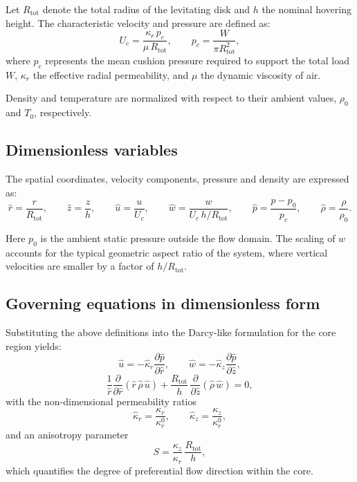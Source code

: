 \documentclass[11pt,a4paper]{article}
\begin{document}
Let \(R_{\mathrm{tot}}\) denote the total radius of the levitating disk and \(h\) the nominal hovering height.  
The characteristic velocity and pressure are defined as:
\[
U_c = \frac{\kappa_r\,p_c}{\mu\,R_{\mathrm{tot}}}, 
\qquad 
p_c = \frac{W}{\pi R_{\mathrm{tot}}^2},
\]
where \(p_c\) represents the mean cushion pressure required to support the total load \(W\), \(\kappa_r\) the effective radial permeability, and \(\mu\) the dynamic viscosity of air.

Density and temperature are normalized with respect to their ambient values, \(\rho_0\) and \(T_0\), respectively.

\subsection{Dimensionless variables}

The spatial coordinates, velocity components, pressure and density are expressed as:
\[
\hat{r} = \frac{r}{R_{\mathrm{tot}}}, \qquad
\hat{z} = \frac{z}{h}, \qquad
\hat{u} = \frac{u}{U_c}, \qquad
\hat{w} = \frac{w}{U_c \, h / R_{\mathrm{tot}}}, \qquad
\hat{p} = \frac{p - p_0}{p_c}, \qquad
\hat{\rho} = \frac{\rho}{\rho_0}.
\]

Here \(p_0\) is the ambient static pressure outside the flow domain.  
The scaling of \(w\) accounts for the typical geometric aspect ratio of the system, where vertical velocities are smaller by a factor of \(h/R_{\mathrm{tot}}\).

\subsection{Governing equations in dimensionless form}

Substituting the above definitions into the Darcy-like formulation for the core region yields:
\[
\hat{u} = -\hat{\kappa}_r \frac{\partial \hat{p}}{\partial \hat{r}}, 
\qquad
\hat{w} = -\hat{\kappa}_z \frac{\partial \hat{p}}{\partial \hat{z}},
\]
\[
\frac{1}{\hat{r}} \frac{\partial}{\partial \hat{r}} 
\left( \hat{r}\, \hat{\rho} \, \hat{u} \right)
+ \frac{R_{\mathrm{tot}}}{h} \,
\frac{\partial}{\partial \hat{z}} 
\left( \hat{\rho} \, \hat{w} \right)
= 0,
\]
with the non-dimensional permeability ratios
\[
\hat{\kappa}_r = \frac{\kappa_r}{\kappa_r^0}, 
\qquad 
\hat{\kappa}_z = \frac{\kappa_z}{\kappa_r^0}, 
\]
and an anisotropy parameter
\[
S = \frac{\kappa_z}{\kappa_r} \, \frac{R_{\mathrm{tot}}}{h},
\]
which quantifies the degree of preferential flow direction within the core.
\end{document}
